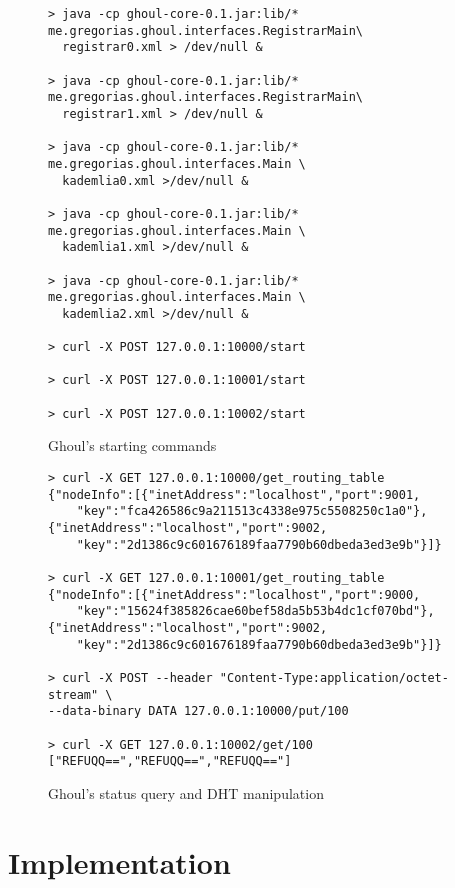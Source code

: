 \begin{figure}[tb]
\begin{verbatim}
> java -cp ghoul-core-0.1.jar:lib/* me.gregorias.ghoul.interfaces.RegistrarMain\
  registrar0.xml > /dev/null &

> java -cp ghoul-core-0.1.jar:lib/* me.gregorias.ghoul.interfaces.RegistrarMain\
  registrar1.xml > /dev/null &

> java -cp ghoul-core-0.1.jar:lib/* me.gregorias.ghoul.interfaces.Main \ 
  kademlia0.xml >/dev/null &

> java -cp ghoul-core-0.1.jar:lib/* me.gregorias.ghoul.interfaces.Main \ 
  kademlia1.xml >/dev/null &

> java -cp ghoul-core-0.1.jar:lib/* me.gregorias.ghoul.interfaces.Main \ 
  kademlia2.xml >/dev/null &

> curl -X POST 127.0.0.1:10000/start

> curl -X POST 127.0.0.1:10001/start

> curl -X POST 127.0.0.1:10002/start
\end{verbatim}
\caption{Ghoul's starting commands}
\label{fig:ghoul_manual_run}
\end{figure}

\begin{figure}[tb]
\begin{verbatim}
> curl -X GET 127.0.0.1:10000/get_routing_table
{"nodeInfo":[{"inetAddress":"localhost","port":9001,
    "key":"fca426586c9a211513c4338e975c5508250c1a0"},
{"inetAddress":"localhost","port":9002,
    "key":"2d1386c9c601676189faa7790b60dbeda3ed3e9b"}]}

> curl -X GET 127.0.0.1:10001/get_routing_table
{"nodeInfo":[{"inetAddress":"localhost","port":9000,
    "key":"15624f385826cae60bef58da5b53b4dc1cf070bd"},
{"inetAddress":"localhost","port":9002,
    "key":"2d1386c9c601676189faa7790b60dbeda3ed3e9b"}]}

> curl -X POST --header "Content-Type:application/octet-stream" \ 
--data-binary DATA 127.0.0.1:10000/put/100

> curl -X GET 127.0.0.1:10002/get/100
["REFUQQ==","REFUQQ==","REFUQQ=="]
\end{verbatim}
\caption{Ghoul's status query and DHT manipulation}
\label{fig:ghoul_manipulation}
\end{figure}

\section{Implementation}
\label{sec:implementation}

